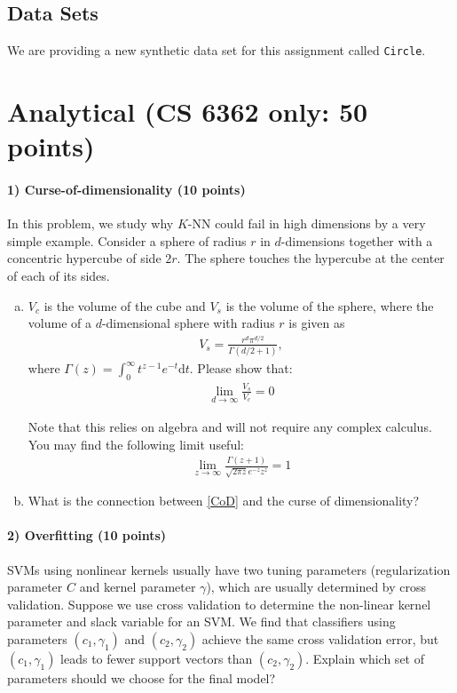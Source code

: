 \documentclass[11pt]{article}
\newcommand{\code}[1]{{\footnotesize \tt #1}}
\begin{document}
\subsection{Data Sets}
We are providing a new synthetic data set for this assignment called \code{Circle}.



\section{Analytical (CS 6362 only: 50 points)}

\paragraph{1) Curse-of-dimensionality (10 points)}
In this problem, we study why $K$-NN could fail in high dimensions by a very simple example. Consider a sphere of radius $r$ in $d$-dimensions together with a concentric hypercube of side $2r$. The sphere touches the hypercube at the center of each of its sides.

\begin{enumerate}[(a)]
\item $V_c$ is the volume of the cube and $V_s$ is the volume of the sphere, where the volume of a $d$-dimensional sphere with radius $r$ is given as 
\begin{eqnarray}
V_s = \frac{r^d\pi^{d/2}}{\Gamma(d/2+1)}, \nonumber
\end{eqnarray}
where $\Gamma(z)=\int_0^{\infty}t^{z-1}e^{-t}\textrm{d}t$. Please show that: 
\begin{eqnarray}
\lim_{d\rightarrow\infty}\frac{V_s}{V_c} = 0
\label{CoD}
\end{eqnarray}

Note that this relies on algebra and will not require any complex calculus. You may find the following limit useful:
\begin{eqnarray}
\lim_{z\rightarrow\infty}\frac{\Gamma(z+1)}{\sqrt{2\pi z}e^{-z}z^z}=1 \nonumber
\end{eqnarray}

\item What is the connection between \eqref{CoD} and the curse of dimensionality?
\end{enumerate}

\paragraph{2) Overfitting (10 points)}
SVMs using nonlinear kernels usually have two tuning parameters (regularization parameter $C$ and kernel parameter $\gamma$), which are usually determined by cross validation. Suppose we use cross validation to determine the non-linear kernel parameter and slack variable for an SVM. We find that classifiers using parameters $(c_1,\gamma_1)$ and $(c_2,\gamma_2)$ achieve the same cross validation error, but $(c_1,\gamma_1)$ leads to fewer support vectors than $(c_2,\gamma_2)$. Explain which set of parameters should we choose for the final model?
\end{document}
